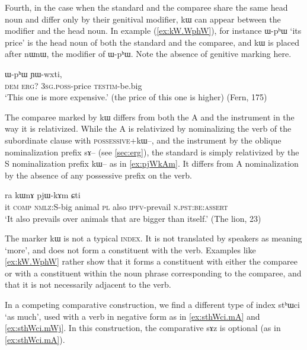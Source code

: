 \documentclass[oldfontcommands,oneside,a4paper,11pt]{article}
\newcommand{\ipa}[1]{{\phon #1}} %
\begin{document}
Fourth, in the case when   the standard and the comparee share the same head noun and differ only by their genitival modifier, \ipa{kɯ} can appear between the modifier and the head noun. In example (\ref{ex:kW.WphW}), for instance \ipa{ɯ-pʰɯ} `its price' is the head noun of both the standard and the comparee, and \ipa{kɯ} is placed after \ipa{nɯnɯ}, the  modifier of   \ipa{ɯ-pʰɯ}. Note the absence of genitive marking here.

 \begin{exe}
\ex \label{ex:kW.WphW}
\gll 
[\ipa{nɯnɯ}]  	\ipa{kɯ}  	\ipa{ɯ-pʰɯ}  	\ipa{ɲɯ-wxti,}  \\
\textsc{dem} \textsc{erg?} \textsc{3sg.poss}-price \textsc{testim}-be.big \\
\glt `This one is more expensive.' (the price of this one is higher) (Fern, 175)
\end{exe}

The comparee marked by \ipa{kɯ} differs from both the A and the instrument in the way it is relativized. While the A is relativized by  nominalizing the verb of the subordinate clause with  \textsc{possessive}+\ipa{kɯ--}, and the instrument by the oblique nominalization prefix \ipa{sɤ--} (see \ref{sec:erg}), the standard is simply relativized by the S nominalization prefix  \ipa{kɯ--} as in   \ref{ex:pjWkAm}. It differs from A nominalization by  the absence of any possessive prefix on the verb.

 
 
\begin{exe}
\ex \label{ex:pjWkAm}
\gll
[\ipa{ɯʑo}  	\ipa{sɤz}  	\ipa{kɯ-wxti}]  	\ipa{rɯdaʁ}  	\ipa{ra}  	\ipa{kɯnɤ}  	\ipa{pjɯ-kɤm}  	\ipa{ɕti}  \\
it \textsc{comp} \textsc{nmlz}:S-big animal \textsc{pl} also \textsc{ipfv}-prevail \textsc{n.pst:be}:\textsc{assert} \\
\glt `It also prevails over animals that are bigger than itself.' (The lion, 23)
  \end{exe}

 
The marker   \ipa{kɯ} is not a typical  \textsc{index}. It is not translated by speakers as meaning `more', and does not form a constituent with the verb. Examples like \ref{ex:kW.WphW} rather show that it forms a constituent with either the comparee or with a constituent within the noun phrase corresponding to the comparee, and that it is not necessarily adjacent to the verb.

In a competing comparative construction, we find a different type of index   \ipa{stʰɯci} `as much', used with a verb in negative form as in \ref{ex:sthWci.mA} and \ref{ex:sthWci.mWj}. In this construction, the comparative \ipa{sɤz} is optional (as in \ref{ex:sthWci.mA}).
 
\end{document}
